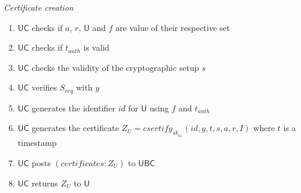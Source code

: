 \documentclass[bibtotoc,halfparskip,oneside]{scrreprt}
\newcommand{\sk}[1]{\mathit{sk}_{#1}\xspace}
\newcommand{\SK}[1]{\sk{_#1}\xspace}
\newcommand{\User}{\ensuremath{\mathsf{U}}\xspace}
\newcommand{\IdentityProvider}{\ensuremath{\mathsf{U}}\xspace}
\newcommand{\UBC}{\ensuremath{\mathsf{UBC}}\xspace}
\newcommand{\UC}{\ensuremath{\mathsf{UC}}\xspace}
\begin{document}
	\textit{Certificate creation}
	\begin{enumerate}[resume]
		\item \UC checks if $a$, $r$, $\IdentityProvider$ and $\mathit{f}$ are value of their respective set
		\item \UC checks if $t_{auth}$ is valid
		\item \UC checks the validity of the cryptographic setup $s$
		\item \UC verifies $S_{req}$ with $y$
		\item \UC generates the identifier $id$ for $\User$ using $\mathit{f}$ and $t_{auth}$
		\item \UC generates the certificate $Z_{U}=\mathit{csertify}_{\SK{\UC}}(id,y,t, s,a,r,I)$ where $t$ is a timestamp
		\item \UC posts $(\mathit{certificates}: Z_{U})$ to \UBC
		\item \UC returns $Z_{U}$ to $\User$
	\end{enumerate} 	
	
	
	
\end{document}
